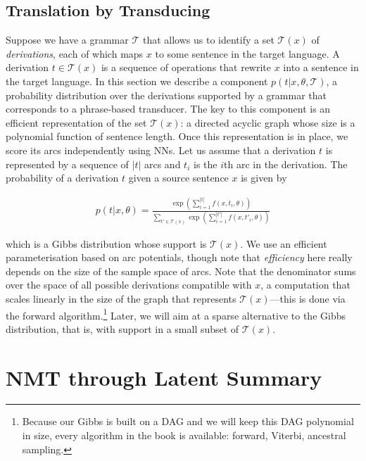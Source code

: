 \subsection{\label{sec:transduction}Translation by Transducing}

Suppose we have a grammar $\mathcal T$ that allows us to identify a
set $\mathcal T(x)$ of \emph{derivations}, each of which maps $x$ to
some sentence in the target language. A derivation $t \in \mathcal
T(x)$ is a sequence of operations that rewrite $x$ into a sentence in
the target language. In this section we describe a component $p(t|x,
\theta, \mathcal T)$, a probability distribution over the derivations
supported by a grammar that corresponds to a phrase-based transducer.
The key to this component is an efficient representation of the set
$\mathcal T(x)$: a directed acyclic graph whose size is a polynomial
function of sentence length. Once this representation is in place, we
score its arcs independently using NNs. Let us assume that a
derivation $t$ is represented by a sequence of $|t|$ arcs and $t_i$
is the $i$th arc in the derivation. The probability of a derivation
$t$ given a source sentence $x$ is given by

\begin{align}
    p(t|x, \theta) =
    \frac
        {\exp(\sum_{i=1}^{|t|} f(x, t_i, \theta))}
        {\sum_{t' \in \mathcal T(x)}
            \exp(\sum_{i=1}^{|t'|} f(x, t'_i, \theta))
        }
\end{align}

\noindent which is a Gibbs distribution whose support is $\mathcal
T(x)$. We use an efficient parameterisation based on arc potentials,
though note that \emph{efficiency} here really depends on the size of
the sample space of arcs. Note that the denominator sums over the
space of all possible derivations compatible with $x$, a computation
that scales linearly in the size of the graph that represents
$\mathcal T(x)$---this is done via the forward
algorithm.\footnote{Because our Gibbs is built on a DAG and we will
keep this DAG polynomial in size, every algorithm in the book is
available: forward, Viterbi, ancestral sampling.} Later, we
will aim at a sparse alternative to the Gibbs distribution, that is,
with support in a small subset of $\mathcal T(x)$.

\section{NMT through Latent Summary}

